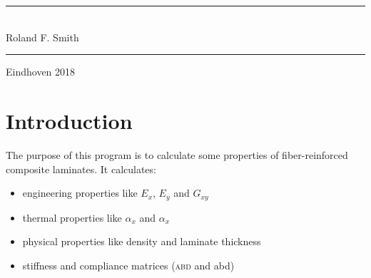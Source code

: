 \documentclass[a4paper,landscape,oneside,11pt,twocolumn]{memoir}
\title{\TheTitle}
\author{Roland F. Smith}
\date{\TheDate}
\begin{document}
\tightlists
\hangcaption
\captiontitlefont{\small}
\doccoltocetc

\nonzeroparskip
\setlength{\parindent}{0pt}
\setbeforesecskip{5pt}
\setaftersecskip{1pt}
\setbeforesubsecskip{5pt}
\setaftersubsecskip{1pt}



\begin{titlingpage}
  \setlength{\parindent}{0pt} %
  \rule{\linewidth}{1mm}\vspace{5pt}
  \begin{flushright}
      {\Huge \TheTitle}\\[5mm]
      {\huge Roland F. Smith}
  \end{flushright}
  \rule{\linewidth}{1mm}
  \begin{center}
    \Large Eindhoven 2018
  \end{center}
\end{titlingpage}

\setcounter{page}{2}
\pagestyle{logboek}

\begin{KeepFromToc}
\tableofcontents
\end{KeepFromToc}
\clearpage

\setcounter{secnumdepth}{1}

\chapter{Introduction} %

The purpose of this program is to calculate some properties of
fiber-reinforced composite laminates. It calculates:
\begin{itemize}
    \item engineering properties like $E_x$, $E_y$ and $G_{xy}$
    \item thermal properties like $\alpha_x$ and $\alpha_x$
    \item physical properties like density and laminate thickness
    \item stiffness and compliance matrices (\textsc{abd}  and abd)
\end{itemize}
\end{document}
